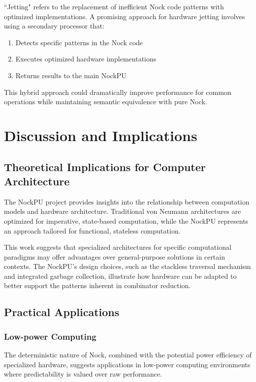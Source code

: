 \documentclass[twoside]{article}
\begin{document}
``Jetting" refers to the replacement of inefficient Nock code patterns with optimized implementations. A promising approach for hardware jetting involves using a secondary processor that:

\begin{enumerate}
  \item Detects specific patterns in the Nock code
  \item Executes optimized hardware implementations
  \item Returns results to the main NockPU
\end{enumerate}

\noindent
This hybrid approach could dramatically improve performance for common operations while maintaining semantic equivalence with pure Nock.

\section{Discussion and Implications}

\subsection{Theoretical Implications for Computer Architecture}

The NockPU project provides insights into the relationship between computation models and hardware architecture. Traditional von Neumann architectures are optimized for imperative, state-based computation, while the NockPU represents an approach tailored for functional, stateless computation.

This work suggests that specialized architectures for specific computational paradigms may offer advantages over general-purpose solutions in certain contexts. The NockPU's design choices, such as the stackless traversal mechanism and integrated garbage collection, illustrate how hardware can be adapted to better support the patterns inherent in combinator reduction.

\subsection{Practical Applications}

\subsubsection{Low-power Computing}

The deterministic nature of Nock, combined with the potential power efficiency of specialized hardware, suggests applications in low-power computing environments where predictability is valued over raw performance.
\end{document}

